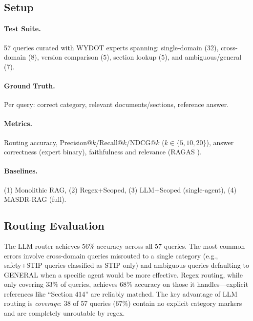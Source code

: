 \documentclass[11pt,a4paper]{article}
\newcommand{\systemname}{\textsc{MASDR-RAG}}
\begin{document}
\subsection{Setup}

\paragraph{Test Suite.} 57 queries curated with WYDOT experts spanning:
single-domain (32), cross-domain (8), version comparison (5), section lookup (5), and ambiguous/general (7).

\paragraph{Ground Truth.} Per query: correct category, relevant documents/sections, reference answer.

\paragraph{Metrics.} Routing accuracy, Precision@$k$/Recall@$k$/NDCG@$k$ ($k \in \{5,10,20\}$), answer correctness (expert binary), faithfulness and relevance (RAGAS \cite{es2024ragas}).

\paragraph{Baselines.} (1) Monolithic RAG, (2) Regex+Scoped, (3) LLM+Scoped (single-agent), (4) \systemname{} (full).

\subsection{Routing Evaluation}
\label{sec:routing_eval}

\begin{table}[H]
\centering
{}
\caption{Routing coverage and accuracy.}
\label{tab:routing_eval}
\end{table}

The LLM router achieves 56\% accuracy across all 57 queries.  The most common errors involve cross-domain queries misrouted to a single category (e.g., safety+STIP queries classified as STIP only) and ambiguous queries defaulting to GENERAL when a specific agent would be more effective. Regex routing, while only covering 33\% of queries, achieves 68\% accuracy on those it handles---explicit references like ``Section 414'' are reliably matched. The key advantage of LLM routing is \textit{coverage}: 38 of 57 queries (67\%) contain no explicit category markers and are completely unroutable by regex.
\end{document}
